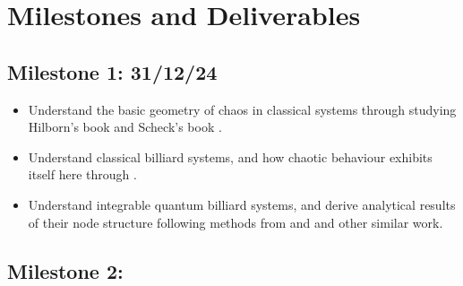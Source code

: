 \documentclass[12pt,a4paper]{amsart}
\begin{document}
\newpage

\section{Milestones and Deliverables}


\subsection*{Milestone 1: 31/12/24}
\begin{itemize}
    \item Understand the basic geometry of chaos in classical systems through studying Hilborn's book \cite{HILBORN} and Scheck's book \cite{SCHECK}.
    \item Understand classical billiard systems, and how chaotic behaviour exhibits itself here through \cite{KORSCH}.
    \item Understand integrable quantum billiard systems, and derive analytical results of their node structure following methods from \cite{ARND} and \cite{CASATI} and other similar work.
\end{itemize}
\subsection*{Milestone 2: }





\end{document}
